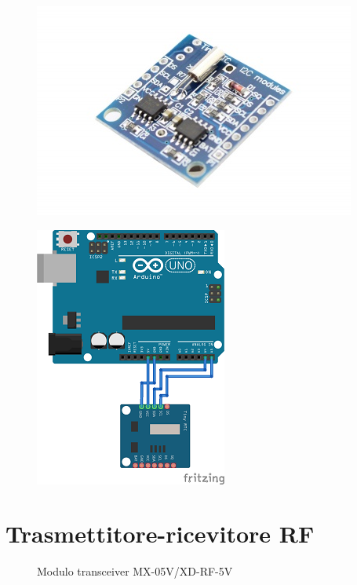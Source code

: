 \documentclass[12pt]{report}
\begin{document}
\begin{figure}[H]
	\centering
	\begin{minipage}{0.5\textwidth}
		\centering
		\includegraphics[width=0.5\linewidth]{./img/tinyRTC.jpg}
		\label{fig:tinyRTC}
	\end{minipage}%
	\begin{minipage}{0.5\textwidth}
		\centering
		\includegraphics[width=0.55\linewidth]{./img/tinyRTC_uno.png}
		\label{fig:tinyRTC_uno}
	\end{minipage}
\end{figure}

%
\section{Trasmettitore-ricevitore RF}
%

\begin{figure}[H]
	\caption{Modulo transceiver MX-05V/XD-RF-5V}
	\label{fig:rx_tx_module}
\end{figure}
\end{document}

